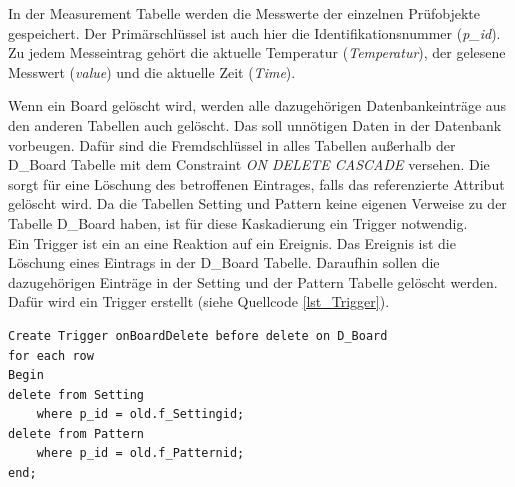 In der Measurement Tabelle werden die Messwerte der einzelnen Prüfobjekte gespeichert. Der Primärschlüssel ist auch hier die Identifikationsnummer (\textit{p\_id}). Zu jedem Messeintrag gehört die aktuelle Temperatur (\textit{Temperatur}), der gelesene Messwert (\textit{value}) und die aktuelle Zeit (\textit{Time}).

Wenn ein Board gelöscht wird, werden alle dazugehörigen Datenbankeinträge aus den anderen Tabellen auch gelöscht. Das soll unnötigen Daten in der Datenbank vorbeugen. Dafür sind die Fremdschlüssel in alles Tabellen außerhalb der D\_Board Tabelle mit dem Constraint \textit{ON DELETE CASCADE} versehen. Die sorgt für eine Löschung des betroffenen Eintrages, falls das referenzierte Attribut gelöscht wird. Da die Tabellen Setting und Pattern keine eigenen Verweise zu der Tabelle D\_Board haben, ist für diese Kaskadierung ein Trigger notwendig. \\
Ein Trigger ist ein an eine Reaktion auf ein Ereignis. Das Ereignis ist die Löschung eines Eintrags in der D\_Board Tabelle. Daraufhin sollen die dazugehörigen Einträge in der Setting und der Pattern Tabelle gelöscht werden. Dafür wird ein Trigger erstellt (siehe Quellcode \ref{lst_Trigger}).\\

\begin{lstlisting}[caption={onBoardDelete Trigger},label=lst_Trigger]
Create Trigger onBoardDelete before delete on D_Board 
for each row 
Begin 
delete from Setting 
	where p_id = old.f_Settingid;
delete from Pattern 
	where p_id = old.f_Patternid;
end;
\end{lstlisting}

